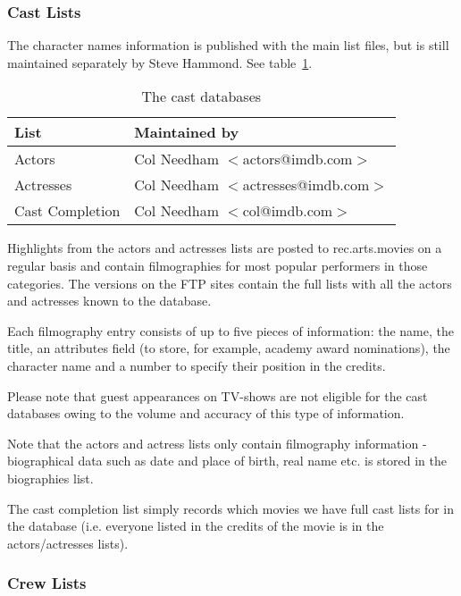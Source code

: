 \subsubsection{Cast Lists}

The character names information is published with the main list files,
but is still maintained separately by Steve Hammond. See 
table~\ref{tbl:cast}.

\begin{table}
\begin{center}
{\small
\begin{tabular}{|l|l|} \hline
List  & Maintained by  \\ \hline
Actors               & Col Needham $<$actors@imdb.com$>$ \\ \hline
Actresses            & Col Needham $<$actresses@imdb.com$>$ \\ \hline
Cast Completion      & Col Needham $<$col@imdb.com$>$ \\ \hline
\end{tabular}}
\caption{\label{tbl:cast} The cast databases}
\end{center}
\end{table}

Highlights from the actors and actresses lists are posted to 
rec.arts.movies on
a regular basis and contain filmographies for most popular performers in
those categories. The versions on the FTP sites contain the full lists with
all the actors and actresses known to the database.

Each filmography entry consists of up to five pieces of information: the 
name, the title, an attributes field (to store, for example, academy award 
nominations), the character name and a number to specify their position in
the credits.

Please note that guest appearances on TV-shows are not eligible for the 
cast
databases owing to the volume and accuracy of this type of information.

Note that the actors and actress lists only contain filmography 
information -
biographical data such as date and place of birth, real name etc. is stored
in the biographies list.

The cast completion list simply records which movies we have full cast lists
for in the database (i.e. everyone listed in the credits of the movie is in
the actors/actresses lists).

\subsubsection{Crew Lists}

